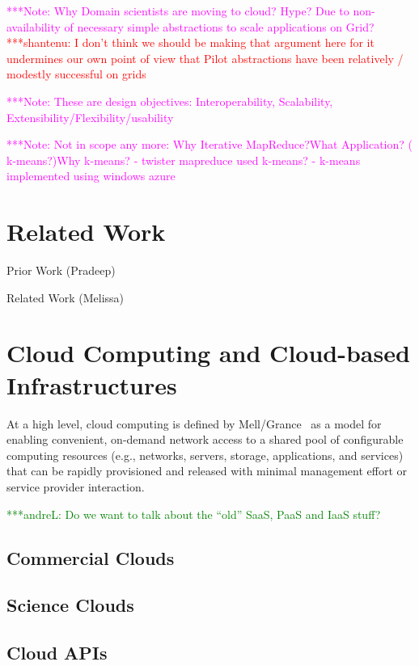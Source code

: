 \documentclass[times]{cpeauth}
\newcommand{\jhanote}[1]{ {\textcolor{red} { ***shantenu: #1 }}}
\newcommand{\alnote}[1]{ {\textcolor{green} { ***andreL: #1 }}}
\newcommand{\note}[1]{ {\textcolor{magenta} { ***Note: #1 }}}
\newcommand{\alnote}[1]{}
\newcommand{\jhanote}[1]{}
\newcommand{\note}[1]{}
\begin{document}
\note{Why Domain scientists are moving to cloud? Hype? Due to
  non-availability of necessary simple abstractions to scale
  applications on Grid?} \jhanote{I don't think we should be making
    that argument here for it undermines our own point of view that
    Pilot abstractions have been relatively / modestly successful on
    grids}

\note{These are design objectives: Interoperability, Scalability,
  Extensibility/Flexibility/usability}

\note{Not in scope any more: Why Iterative MapReduce?What
  Application?  ( k-means?)Why k-means?  - twister mapreduce used
  k-means?  - k-means implemented using windows azure}


\section{Related Work}

Prior Work (Pradeep)

Related Work (Melissa)



\section{Cloud Computing and Cloud-based Infrastructures}

At a high level, cloud computing is defined by Mell/Grance~\cite{nist_cloud}
as a model for enabling convenient, on-demand network access to a shared pool
of configurable computing resources (e.g., networks, servers, storage,
applications, and services) that can be rapidly provisioned and released with
minimal management effort or service provider interaction.

\alnote{Do we want to talk about the ``old'' SaaS, PaaS and IaaS stuff?}

\subsection{Commercial Clouds}

\subsection{Science Clouds}

\subsection{Cloud APIs}
\end{document}
